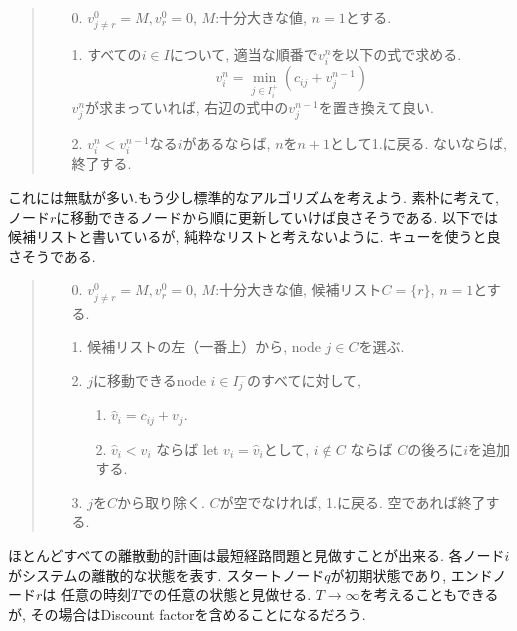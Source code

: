 \documentclass[11pt]{jsbook}
\begin{document}
\begin{quote}
\begin{enumerate}
	\item[0.] $v_{j\neq r}^0 = M, v_r^0 = 0$, $M$:十分大きな値, $n=1$とする.
	\item[1.] すべての$i \in I$について, 適当な順番で$v_i^n$を以下の式で求める.
	\begin{equation}
		v_i^n = \min_{j \in I_i^{+}} \left( c_{ij} + v_j^{n-1} \right)
	\end{equation}
	$v_j^n$が求まっていれば, 右辺の式中の$v_j^{n-1}$を置き換えて良い.
	\item[2.] $v_i^n < v_i^{n-1}$なる$i$があるならば, $n$を$n+1$として1.に戻る. ないならば, 終了する.
\end{enumerate}
\end{quote}

これには無駄が多い.もう少し標準的なアルゴリズムを考えよう. 
素朴に考えて, ノード$r$に移動できるノードから順に更新していけば良さそうである.
以下では候補リストと書いているが, 純粋なリストと考えないように. キューを使うと良さそうである.

\begin{quote}
\begin{enumerate}
	\item[0.] $v_{j\neq r}^0 = M, v_r^0 = 0$, $M$:十分大きな値, 候補リスト$C=\{r\}$, $n=1$とする.
	\item[1.] 候補リストの左（一番上）から, node $j \in C$を選ぶ.
	\item[2.] $j$に移動できるnode $i \in I_j^{-}$のすべてに対して,
	\begin{enumerate}
		\item [1.] $\hat{v}_i = c_{ij} + v_j$.
		\item [2.] $\hat{v}_i < v_i$ ならば let $v_i = \hat{v}_i$として, $i \notin C$ ならば $C$の後ろに$i$を追加する.
	\end{enumerate}
	\item [3.] $j$を$C$から取り除く. $C$が空でなければ, 1.に戻る. 空であれば終了する.
\end{enumerate}
\end{quote}

ほとんどすべての離散動的計画は最短経路問題と見做すことが出来る.
各ノード$i$がシステムの離散的な状態を表す. スタートノード$q$が初期状態であり, エンドノード$r$は
任意の時刻$T$での任意の状態と見做せる.
$T \to \infty$を考えることもできるが, その場合はDiscount factorを含めることになるだろう.
\end{document}
